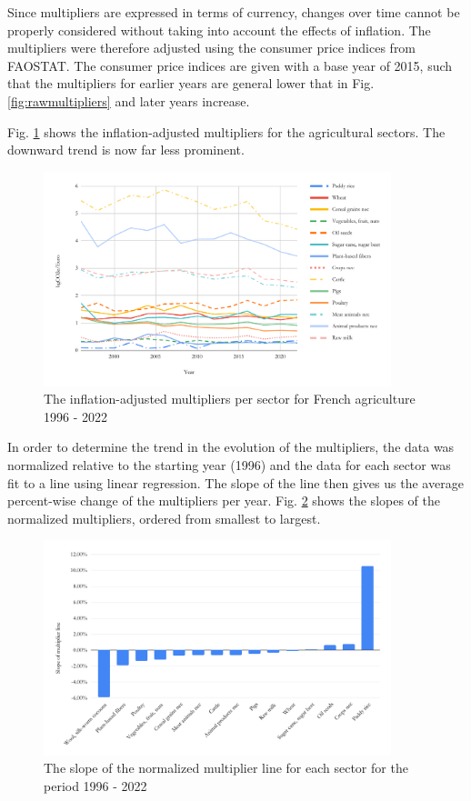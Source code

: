 \documentclass[a4paper,twoside]{article}
\begin{document}
Since multipliers are expressed in terms of currency, changes over time cannot be properly considered without taking into account the effects of inflation. The multipliers were therefore adjusted using the consumer price indices from FAOSTAT. The consumer price indices are given with a base year of 2015, such that the multipliers for earlier years are general lower that in Fig. \ref{fig:rawmultipliers} and later years increase.

Fig. \ref{fig:adjustedmultipliers} shows the inflation-adjusted multipliers for the agricultural sectors. The downward trend is now far less prominent. 

\begin{figure}[H]
\centering
\includegraphics[width=0.9\textwidth]{inflated_adjusted}
\caption{The inflation-adjusted multipliers per sector for French agriculture 1996 - 2022}\label{fig:adjustedmultipliers} 
\end{figure}

In order to determine the trend in the evolution of the multipliers, the data was normalized relative to the starting year (1996) and the data for each sector was fit to a line using linear regression. The slope of the line then gives us the average percent-wise change of the multipliers per year. Fig. \ref{fig:slope} shows the slopes of the normalized multipliers, ordered from smallest to largest. 

\begin{figure}[H]
\centering
\includegraphics[width=0.9\textwidth]{slope}
\caption{The slope of the normalized multiplier line for each sector for the period 1996 - 2022}\label{fig:slope} 
\end{figure}
\end{document}
